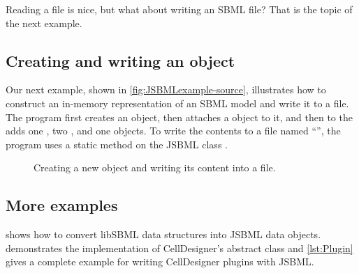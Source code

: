 Reading a file is nice, but what about writing an SBML file?  That is the
topic of the next example.



\subsection{Creating and writing an  object}

Our next example, shown in \vref{fig:JSBMLexample-source},
illustrates how to construct an in-memory representation of an SBML model
and write it to a file. The program first creates an \SBMLDocument object,
then attaches a \Model object to it, and then to the \Model adds one
\Compartment, two \Species, and one \Reaction objects. To write the
contents to a file named ``'', the program uses a static
method on the JSBML class \SBMLWriter.

\begin{figure}[bht]
  \vspace*{-1ex}
  \vspace*{-1.5ex}
  \caption{Creating a new  object and writing its content
    into a file.}
  \label{fig:JSBMLexample-source}
\end{figure}


\subsection{More examples}

 shows how to convert libSBML data structures into
JSBML data objects.  demonstrates the implementation
of CellDesigner's abstract class  and \vref{lst:Plugin}
gives a complete example for writing CellDesigner plugins with
JSBML. 
